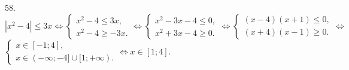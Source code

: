 58. $|x^2-4|\leqslant3x\Leftrightarrow \begin{cases} x^2-4\leqslant3x,\\ x^2-4\geqslant-3x.\end{cases}\Leftrightarrow \begin{cases} x^2-3x-4\leqslant0,\\ x^2+3x-4\geqslant0.\end{cases}\Leftrightarrow \begin{cases} (x-4)(x+1)\leqslant0,\\ (x+4)(x-1)\geqslant0.\end{cases}
\Leftrightarrow$\\$ \begin{cases} x\in[-1;4],\\ x\in(-\infty;-4]\cup[1;+\infty).\end{cases}\Leftrightarrow x\in[1;4].$\\
